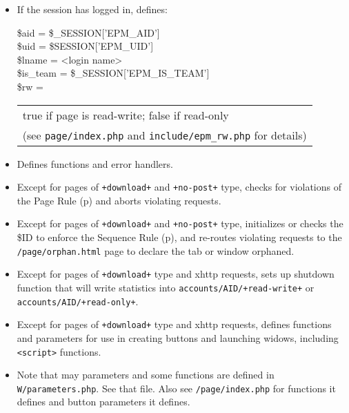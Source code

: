 \documentclass[12pt]{article}
\newcommand{\EOL}{\penalty \exhyphenpenalty}
\newcommand{\pagref}[1]{p\pageref{#1}}
\begin{document}
\begin{enumerate}
\begin{itemize}
\item If the session has logged in, defines:
\\[2ex]
\hspace*{0.2in}\begin{minipage}{5in}
\$aid = \$\_SESSION['EPM\_AID'] \\
\$uid = \$SESSION['EPM\_UID'] \\
\$lname = <login name> \\
\$is\_team = \$\_SESSION['EPM\_IS\_TEAM'] \\
\$rw = \begin{tabular}[t]{@{}l@{}}
       true if page is read-write; false if read-only \\
       (see {\tt page/index.php} and {\tt include/epm\_rw.php} for details)
       \end{tabular}
\end{minipage}

\item Defines functions and error handlers.

\item Except for pages of {\tt +download+} and {\tt +no-post+} type,
      checks for violations of the Page Rule (\pagref{PAGE-RULE})
      and aborts violating requests.

\item Except for pages of {\tt +download+} and {\tt +no-post+} type,
      initializes or checks the \$ID to enforce the
      Sequence Rule (\pagref{SEQUENCE-RULE}), and
      re-routes violating requests
      to the {\tt /page/orphan.html} page to declare
      the tab or window orphaned.

\item Except for pages of {\tt +download+} type and xhttp requests,
      sets up shutdown function that will write statistics
      into {\tt accounts/\EOL AID/\EOL +read-write+} or
      {\tt accounts/\EOL AID/\EOL +read-only+}.
\item Except for pages of {\tt +download+} type and xhttp requests,
      defines functions
      and parameters for use in creating buttons and launching
      widows, including {\tt <script>} functions.

\item Note that may parameters and some functions are defined in
      {\tt W/parameters.php}.  See that file.  Also see
      {\tt /page/index.php} for functions it defines and button
      parameters it defines.


\end{itemize}

\end{enumerate}
\end{document}
